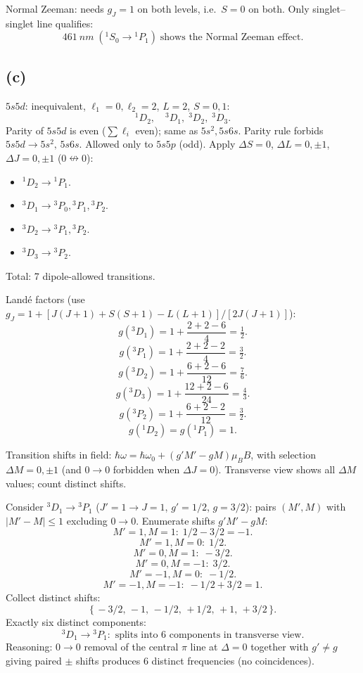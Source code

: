\documentclass[11pt]{article}
\begin{document}
Normal Zeeman: needs $g_J=1$ on both levels, i.e.\ $S=0$ on both. Only singlet--singlet line qualifies:
\[ \boxed{\;\SI{461}{nm}\;({}^1S_0\to{}^1P_1)\;\text{shows the Normal Zeeman effect.}\;} \]

\subsection*{(c)}

$5s5d$: inequivalent, $\ell_1=0,\ell_2=2$, $L=2$, $S=0,1$:
\[ {}^1D_2,\quad {}^3D_1,\;{}^3D_2,\;{}^3D_3. \]
Parity of $5s5d$ is even ($\sum\ell_i$ even); same as $5s^2,5s6s$. Parity rule forbids $5s5d\to 5s^2,\,5s6s$. Allowed only to $5s5p$ (odd). Apply $\Delta S=0$, $\Delta L=0,\pm1$, $\Delta J=0,\pm1$ ($0\nleftrightarrow 0$):
\begin{itemize}
\item ${}^1D_2\to{}^1P_1$.
\item ${}^3D_1\to{}^3P_0,{}^3P_1,{}^3P_2$.
\item ${}^3D_2\to{}^3P_1,{}^3P_2$.
\item ${}^3D_3\to{}^3P_2$.
\end{itemize}
Total: 7 dipole-allowed transitions.

Land\'e factors (use $g_J=1+[J(J+1)+S(S+1)-L(L+1)]/[2J(J+1)]$):
\[ g({}^3D_1)=1+\frac{2+2-6}{4}=\tfrac{1}{2}. \]
\[ g({}^3P_1)=1+\frac{2+2-2}{4}=\tfrac{3}{2}. \]
\[ g({}^3D_2)=1+\frac{6+2-6}{12}=\tfrac{7}{6}. \]
\[ g({}^3D_3)=1+\frac{12+2-6}{24}=\tfrac{4}{3}. \]
\[ g({}^3P_2)=1+\frac{6+2-2}{12}=\tfrac{3}{2}. \]
\[ g({}^1D_2)=g({}^1P_1)=1. \]

Transition shifts in field: $\hbar\omega=\hbar\omega_0+(g'M'-gM)\mu_B B$, with selection $\Delta M=0,\pm 1$ (and $0\to0$ forbidden when $\Delta J=0$). Transverse view shows all $\Delta M$ values; count distinct shifts.

Consider ${}^3D_1\to{}^3P_1$ ($J'=1\to J=1$, $g'=1/2$, $g=3/2$): pairs $(M',M)$ with $|M'-M|\le1$ excluding $0\to 0$. Enumerate shifts $g'M'-gM$:
\[ M'=1,M=1:\;1/2-3/2=-1. \]
\[ M'=1,M=0:\;1/2. \]
\[ M'=0,M=1:\;-3/2. \]
\[ M'=0,M=-1:\;3/2. \]
\[ M'=-1,M=0:\;-1/2. \]
\[ M'=-1,M=-1:\;-1/2+3/2=1. \]
Collect distinct shifts:
\[ \{\,-3/2,\,-1,\,-1/2,\,+1/2,\,+1,\,+3/2\,\}. \]
Exactly six distinct components:
\[ \boxed{\;{}^3D_1\to{}^3P_1:\text{ splits into 6 components in transverse view.}\;} \]
Reasoning: $0\to 0$ removal of the central $\pi$ line at $\Delta=0$ together with $g'\ne g$ giving paired $\pm$ shifts produces 6 distinct frequencies (no coincidences).
\end{document}
